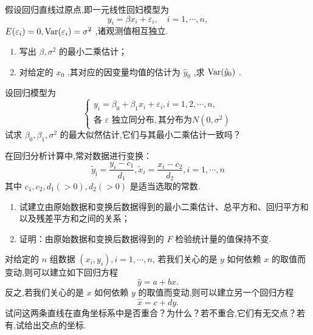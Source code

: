 \begin{xiti}
    \item 假设回归直线过原点,即一元线性回妇模型为
    \begin{equation*}
    y_i=\beta x_i+\varepsilon_i,\quad i=1,\cdots ,n,
    \end{equation*}
 $E(\varepsilon_i)=0, \operatorname{Var}(\varepsilon_i)=\sigma^2$ ,诸观测值相互独立.
    \begin{enumerate}
        \item 写出 $\beta,\sigma^2$ 的最小二乘估计；
        \item 对给定的 $x_0$ ,其对应的因变量均值的估计为 $\hat{y}_0$ ,求 $\operatorname{Var}(\hat{y}_0)$ .
    \end{enumerate}
    \item 设回归模型为
    \begin{equation*}
      \begin{cases}
        y_i=\beta _0+\beta _1x_i+\varepsilon _i,i=1,2,\cdots ,n,\\
    \text{各 $\varepsilon$ 独立同分布}, \text{其分布为} N(0,\sigma^2)
      \end{cases}
    \end{equation*}
    试求 $\beta_0,\beta_1,\sigma^2$ 的最大似然估计,它们与其最小二乘估计一致吗？
    \item 在回归分析计算中,常对数据进行变换：
    \begin{equation*}
    \tilde{y}_{\mathrm{i}}=\frac{y_{i}-c_{1}}{d_{1}}, \tilde{x}_{i}=\frac{x_{i}-c_{2}}{d_{2}}, i=1, \cdots, n
    \end{equation*}
    其中 $c_1,c_2,d_1(>0),d_2(>0)$ 是适当选取的常数.
    \begin{enumerate}
        \item 试建立由原始数据和变换后数据得到的最小二乘估计、总平方和、回归平方和以及残差平方和之间的关系；
        \item 证明：由原始数据和变换后数据得到的 $F$ 检验统计量的值保持不变.
    \end{enumerate}
    \item 对给定的 $n$ 组数据 $(x_{i}, y_{i}),i=1,\cdots,n$, 若我们关心的是 $y$ 如何依赖 $x$ 的取值而变动,则可以建立如下回归方程\begin{equation*}
    \hat{y}=a+bx.
    \end{equation*}
    反之,若我们关心的是 $x$ 如何依赖 $y$ 的取值而变动,则可以建立另一个回归方程
    \begin{equation*}
    \hat{x}=c+dy.
    \end{equation*}
    试问这两条直线在直角坐标系中是否重合？为什么？若不重合,它们有无交点？若有,试给出交点的坐标.

\end{xiti}
